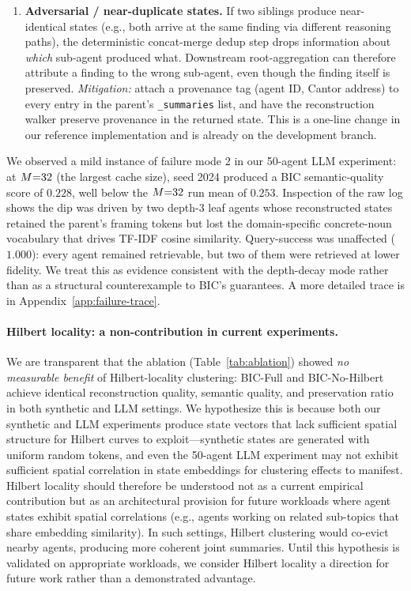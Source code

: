\begin{enumerate}
\item \textbf{Adversarial / near-duplicate states.}  If two siblings
  produce near-identical states (e.g., both arrive at the same
  finding via different reasoning paths), the deterministic
  concat-merge dedup step drops information about \emph{which}
  sub-agent produced what.  Downstream root-aggregation can therefore
  attribute a finding to the wrong sub-agent, even though the
  finding itself is preserved.  \emph{Mitigation:} attach a
  provenance tag (agent ID, Cantor address) to every entry in the
  parent's \texttt{\_summaries} list, and have the reconstruction
  walker preserve provenance in the returned state.  This is a
  one-line change in our reference implementation and is already
  on the development branch.
\end{enumerate}

We observed a mild instance of failure mode 2 in our 50-agent LLM
experiment: at $M{=}32$ (the largest cache size), seed 2024
produced a BIC semantic-quality score of $0.228$, well below the
$M{=}32$ run mean of $0.253$.  Inspection of the raw log shows
the dip was driven by two depth-3 leaf agents whose reconstructed
states retained the parent's framing tokens but lost the
domain-specific concrete-noun vocabulary that drives TF-IDF cosine
similarity.  Query-success was unaffected ($1.000$): every agent
remained retrievable, but two of them were retrieved at lower
fidelity.  We treat this as evidence consistent with the depth-decay
mode rather than as a structural counterexample to BIC's guarantees.
A more detailed trace is in Appendix~\ref{app:failure-trace}.

\paragraph{Hilbert locality: a non-contribution in current experiments.}
We are transparent that the ablation (Table~\ref{tab:ablation}) showed
\emph{no measurable benefit} of Hilbert-locality clustering:
BIC-Full and BIC-No-Hilbert achieve identical reconstruction quality,
semantic quality, and preservation ratio in both synthetic and LLM
settings.  We hypothesize this is because both our synthetic and
LLM experiments produce state vectors that lack sufficient
spatial structure for Hilbert curves to exploit---synthetic states are
generated with uniform random tokens, and even the 50-agent LLM
experiment may not exhibit sufficient spatial correlation in state
embeddings for clustering effects to manifest.  Hilbert locality
should therefore be understood not as a current empirical contribution
but as an architectural provision for future workloads where agent
states exhibit spatial correlations (e.g., agents working on related
sub-topics that share embedding similarity).  In such settings,
Hilbert clustering would co-evict nearby agents, producing more
coherent joint summaries.  Until this hypothesis is validated on
appropriate workloads, we consider Hilbert locality a direction for
future work rather than a demonstrated advantage.

